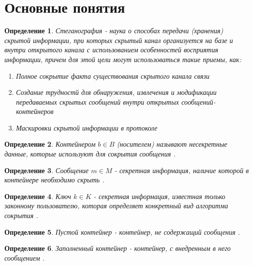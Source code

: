 ﻿\documentclass[a4paper,12pt]{article}
\theoremstyle{plain}
\newtheorem{definition}{Определение}[section]
\begin{document}
\section{Основные понятия}
\vspace*{1cm}
\begin{definition}\label{stegonagraphy}
Стеганография - наука о способах передачи (хранения) скрытой информации, при которых скрытый канал организуется на базе и внутри открытого канала с использованием особенностей восприятия информации, причем для этой цели могут использоваться такие приемы, \cite{agranovskiy}как:
\begin{enumerate}
	\item Полное сокрытие факта существования  скрытого канала связи
	\item Создание трудностй для обнаружения, извлечения и модификации передаваемых скрытых сообщений внутри открытых сообщений-контейнеров
	\item Маскировки скрытой информации в протоколе
\end{enumerate}
\end{definition}

\begin{definition}\label{container}
	Контейнером $b \in B$ (носителем) называют несекретные данные, которые используют для сокрытия сообщения \cite{agranovskiy}.
\end{definition}

\begin{definition}\label{message}
	Сообщение $m \in M$ - секретная информация, наличие которой в контейнере необходимо скрыть \cite{agranovskiy}.
\end{definition}

\begin{definition}\label{key}
	Ключ $k \in K$ - секретная информация, известная только законному пользователю, которая определяет конкретный вид алгоритма сокрытия \cite{agranovskiy}.
\end{definition}

\begin{definition}\label{free container}
	Пустой контейнер - контейнер, не содержащий сообщения \cite{agranovskiy}.
\end{definition}

\begin{definition}\label{full container}
	Заполненный контейнер - контейнер, с внедренным в него сообщением \cite{agranovskiy}.
\end{definition}
\end{document}
